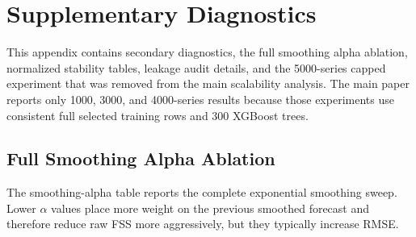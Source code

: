 \documentclass[10pt,conference]{IEEEtran}
\begin{document}
\FloatBarrier
\appendices
\section{Supplementary Diagnostics}
This appendix contains secondary diagnostics, the full smoothing alpha ablation, normalized stability tables, leakage audit details, and the 5000-series capped experiment that was removed from the main scalability analysis. The main paper reports only 1000, 3000, and 4000-series results because those experiments use consistent full selected training rows and 300 XGBoost trees.

\subsection{Full Smoothing Alpha Ablation}
The smoothing-alpha table reports the complete exponential smoothing sweep. Lower $\alpha$ values place more weight on the previous smoothed forecast and therefore reduce raw FSS more aggressively, but they typically increase RMSE.
\end{document}

